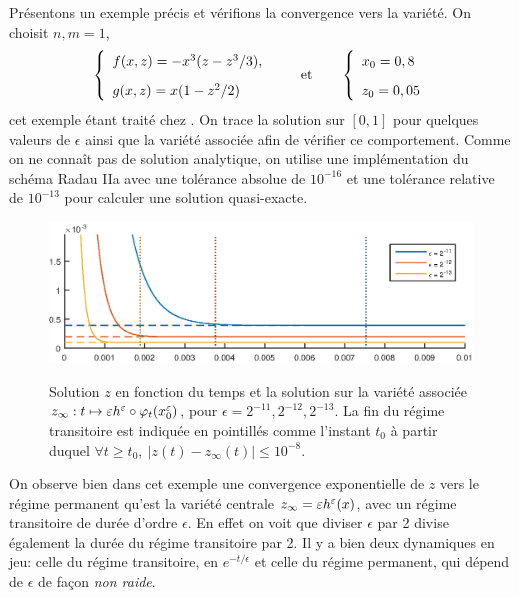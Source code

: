 Présentons un exemple précis et vérifions la convergence vers la variété. On choisit $n,m = 1$, 
\begin{equation} \label{pb:edo_partic_1}
\left\{ \begin{array}{l}
f(x,z) = -x^3(z-z^3/3) \vphantom{\displaystyle\sum_0} , \\
g(x,z) = x(1-z^2/2) 
\end{array} \right. 
\qquad \text{et} \qquad 
\left\{ \begin{array}{l}
x_0 = 0,8 \vphantom{\displaystyle\sum_0} \\
z_0 = 0,05 
\end{array} \right.
\end{equation}
cet exemple étant traité chez \cite{castella2016formal}. 
On trace la solution sur $[0,1]$ pour quelques valeurs de $\epsilon$ ainsi que la variété associée afin de vérifier ce comportement. 
Comme on ne connaît pas de solution analytique, on utilise une implémentation  du schéma Radau IIa\cite{codeRADAU} avec une tolérance absolue de $10^{-16}$ et une tolérance relative de $10^{-13}$ pour calculer une solution quasi-exacte. 
\begin{figure}[!h]
\centering\label{fig:sol_periode_transitoire}
\includegraphics[width=.85\textwidth]{img/chap1/solution_transition_v2.eps}
\caption{Solution $z$ en fonction du temps et la solution sur la variété associée $z_{\infty}:t\mapsto \varepsilon h^{\varepsilon} \circ \varphi_t(x_0^{\varepsilon})$, pour $\epsilon = 2^{-11},2^{-12},2^{-13}$. La fin du régime transitoire est indiquée en pointillés comme l'instant $t_0$ à partir duquel $\forall t\geq t_0,\ |z(t)-z_{\infty}(t)| \leq 10^{-8}$.}
\end{figure}

On observe bien dans cet exemple une convergence exponentielle de $z$ vers le régime permanent qu'est la variété centrale $z_{\infty} = \varepsilon h^{\varepsilon}(x)$, avec un régime transitoire de durée d'ordre $\epsilon$. 
En effet on voit que diviser $\epsilon$ par 2 divise également la durée du régime transitoire par 2. 
Il y a bien deux dynamiques en jeu: celle du régime transitoire, en $e^{-t/\epsilon}$ et celle du régime permanent, qui dépend de $\epsilon$ de façon \textit{non raide}. \\


